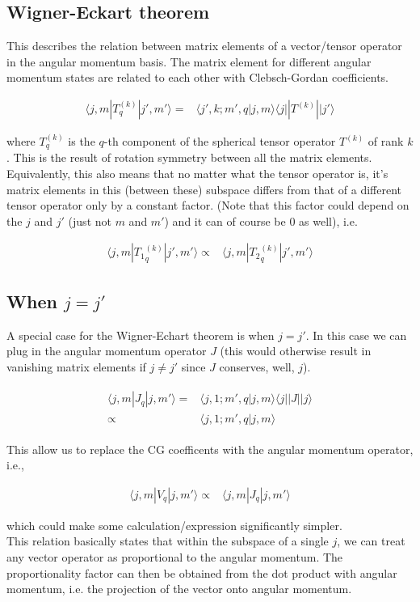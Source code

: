 \documentclass[10pt,fleqn]{article}
\newcommand{\eqar}[1]
{
  \begin{align}
    #1
  \end{align}
}
\begin{document}
\subsection{Wigner-Eckart theorem}
This describes the relation between matrix elements of a vector/tensor operator
in the angular momentum basis.
The matrix element for different angular momentum states are related to each other
with Clebsch-Gordan coefficients.
\eqar{
  \langle j,m|T_q^{(k)}|j',m' \rangle=&\langle j',k;m',q|j,m\rangle\langle j||T^{(k)}||j'\rangle
}
where $T_q^{(k)}$ is the $q$-th component of
the spherical tensor operator $T^{(k)}$ of rank $k$.
This is the result of rotation symmetry between all the matrix elements.\\

Equivalently, this also means that no matter what the tensor operator is,
it's matrix elements in this (between these) subspace
differs from that of a different tensor operator only by a constant factor.
(Note that this factor could depend on the $j$ and $j'$ (just not $m$ and $m'$)
and it can of course be $0$ as well), i.e.
\eqar{
  \langle j,m|{T_1}_q^{(k)}|j',m'\rangle\propto&\langle j,m|{T_2}_q^{(k)}|j',m'\rangle
}

\subsection{When $j=j'$}
A special case for the Wigner-Echart theorem is when $j=j'$.
In this case we can plug in the angular momentum operator $J$
(this would otherwise result in vanishing matrix elements if $j\neq j'$
since $J$ conserves, well, $j$).
\eqar{
  \begin{split}
    \langle j,m|J_q|j,m' \rangle=&\langle j,1;m',q|j,m\rangle\langle j||J||j\rangle\\
    \propto&\langle j,1;m',q|j,m\rangle
  \end{split}
}
This allow us to replace the CG coefficents with the angular momentum operator, i.e.,
\eqar{
  \label{eq:jj:prop1}
  \langle j,m|V_q|j,m'\rangle\propto&\langle j,m|J_q|j,m'\rangle
}
which could make some calculation/expression significantly simpler.\\

This relation basically states that within the subspace of a single $j$,
we can treat any vector operator as proportional to the angular momentum.
The proportionality factor can then be obtained from the dot product
with angular momentum, i.e. the projection of the vector onto angular momentum.
\end{document}
